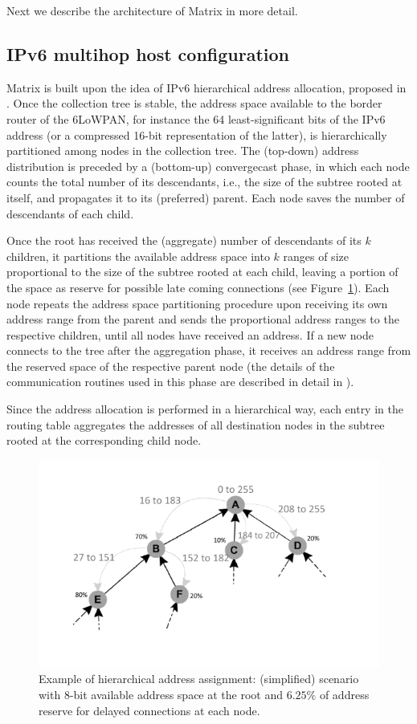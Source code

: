 Next we describe the architecture of Matrix in more detail.

\subsection{IPv6 multihop host configuration}

Matrix is built upon the idea of IPv6 hierarchical address
allocation, proposed in \cite{mhcl, 2016techreport}. Once the collection tree is
stable, the address space available to the border router of the
6LoWPAN, for instance the 64 least-significant bits of the IPv6
address (or a compressed 16-bit representation of the latter), is
hierarchically partitioned among nodes in the collection tree. The
(top-down) address distribution is preceded by a (bottom-up)
convergecast phase, in which each node counts the total number of
its descendants, i.e., the size of the subtree rooted at itself, and
propagates it to its (preferred) parent. Each node saves the number
of descendants of each child. 

Once the root has received the
(aggregate) number of descendants of its $k$ children, it partitions
the available address space into $k$ ranges of size proportional to
the size of the subtree rooted at each child, leaving a portion of
the space as reserve for possible late coming connections (see
Figure~\ref{fig:mhcl}). Each node repeats the address space
partitioning procedure upon receiving its own address range from the
parent and sends the proportional address ranges to the respective
children, until all nodes have received an address. If a new node
connects to the tree after the aggregation phase, it receives an
address range from the reserved space of the respective parent node
(the details of the communication routines used in this phase are
described in detail in \cite{2016techreport}).

Since the address allocation is performed in a hierarchical way, each entry in
the routing table aggregates the addresses of all destination nodes
in the subtree rooted at the corresponding child node. 


\begin{figure}[ht]
    \centering
    \includegraphics[width=0.9\linewidth]{./Images/mhcl.pdf}
\caption{Example of hierarchical address assignment: (simplified)
scenario with 8-bit available address space at the root and $6.25\%$
of address reserve for delayed connections at each node.}
    \label{fig:mhcl}
\end{figure}

